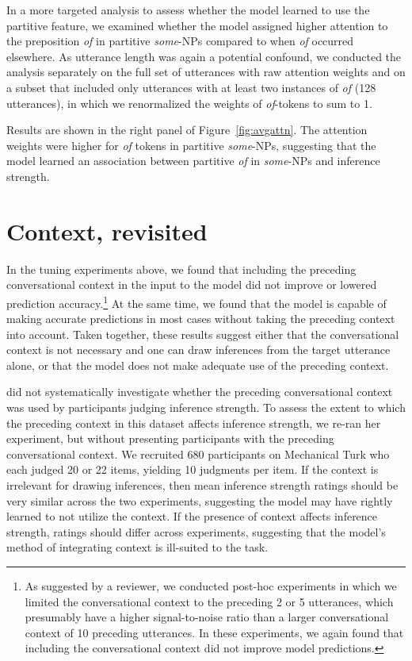 \documentclass[11pt,a4paper]{article}
\newcommand{\figref}[1]{Figure~\ref{#1}}
\begin{document}
In a more targeted analysis to assess whether the model learned to use the partitive feature, we examined whether the model assigned higher attention to the preposition \emph{of} in partitive \emph{some}-NPs compared to when \emph{of} occurred elsewhere. 
As utterance length was again a potential confound, we conducted the analysis separately on the full set of utterances with raw attention weights and on a subset that included only utterances with at least two instances of \emph{of} (128 utterances), in which we renormalized the weights of \emph{of}-tokens to sum to 1.

Results are shown in the right panel of \figref{fig:avgattn}. The attention weights were higher for \emph{of} tokens in partitive \emph{some}-NPs, suggesting that the model learned an association between partitive \emph{of} in \emph{some}-NPs and inference strength. 


\section{Context, revisited}
\label{sec:context}

In the tuning experiments above, we found that including the preceding conversational context in the input to the model did not improve or  lowered prediction accuracy.\footnote{As suggested by a reviewer, we conducted post-hoc experiments in which we limited the conversational context to the preceding 2 or 5 utterances, which presumably have a higher signal-to-noise ratio than a larger conversational context of 10 preceding utterances. In these experiments, we again found that including the conversational context did not improve model predictions.} At the same time, we found that the model is capable of making accurate predictions in most cases without taking the preceding context into account. Taken together, these results suggest either that the conversational context is not necessary and one can draw inferences from the target utterance alone, or that the model does not make adequate use of the preceding context. 

\citet{degen2015investigating} did not systematically investigate whether the preceding conversational context was used by participants judging inference strength. To assess the extent to which the preceding context in this dataset affects inference strength, we re-ran her experiment, but without presenting participants with the preceding conversational context. We recruited 680 participants on Mechanical Turk who each judged 20 or 22 items, yielding 10 judgments per item. If the context is irrelevant for drawing inferences, then mean inference strength ratings should be very similar across the two experiments, suggesting the model may have rightly learned to not utilize the context. If the presence of context affects inference strength,  ratings should differ across experiments, suggesting that the model's method of integrating context is ill-suited to the task.
\end{document}
